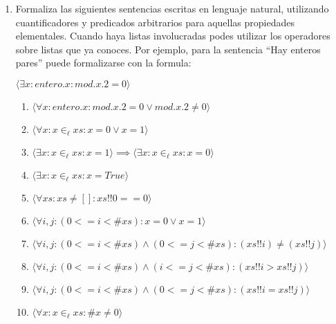 \documentclass[12pt]{article} %
\begin{document}
\begin{enumerate}
    \item Formaliza las siguientes sentencias escritas en lenguaje natural, utilizando cuantificadores y predicados
    arbitrarios para aquellas propiedades elementales. Cuando haya listas involucradas podes utilizar los operadores sobre listas que ya conoces. Por ejemplo, para la sentencia “Hay enteros pares” puede formalizarse
    con la formula:
    \begin{center}
        \( \langle \exists x : entero.x : mod.x . 2 = 0 \rangle \)
    \end{center}
    \begin{enumerate}
        \item \( \langle \forall x : entero.x : mod.x.2 = 0 \lor mod.x.2 \neq 0  \rangle \)
        \item \( \langle \forall x : x \in_\ell xs : x = 0 \lor x = 1  \rangle \)
        \item \( \langle \exists x : x \in_\ell xs : x = 1  \rangle \implies \langle \exists x : x \in_\ell xs : x = 0  \rangle \)
        \item \( \langle \exists x : x \in_\ell xs : x = True  \rangle \)
        \item \( \langle \forall xs : xs \neq [] : xs!!0 == 0  \rangle \)
        \item \( \langle \forall i,j : (0  <= i < \# xs) : x = 0 \lor x = 1  \rangle \)
        \item \( \langle \forall i,j : (0 <= i < \# xs) \land (0 <= j < \# xs): (xs!!i) \neq (xs!!j)  \rangle \)
        \item \( \langle \forall i,j : (0 <= i < \# xs) \land (i <= j < \# xs): (xs!!i > xs!!j)  \rangle \)
        \item \( \langle \forall i,j : (0 <= i < \# xs) \land (0 <= j < \# xs): (xs!!i = xs!!j)  \rangle \)
        \item \( \langle \forall x : x \in_\ell xs : \# x \neq 0  \rangle \)
    \end{enumerate}

\end{enumerate}
\end{document}
